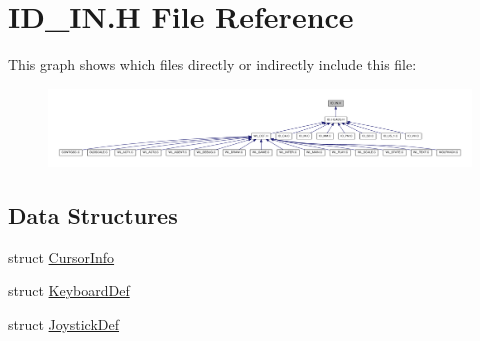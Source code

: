 \hypertarget{ID__IN_8H}{
\section{ID\_\-IN.H File Reference}
\label{ID__IN_8H}
}
This graph shows which files directly or indirectly include this file:
\nopagebreak
\begin{figure}[H]
\begin{center}
\leavevmode
\includegraphics[width=400pt]{ID__IN_8H__dep__incl}
\end{center}
\end{figure}
\subsection*{Data Structures}
\begin{DoxyCompactItemize}
\item 
struct \hyperlink{structCursorInfo}{CursorInfo}
\item 
struct \hyperlink{structKeyboardDef}{KeyboardDef}
\item 
struct \hyperlink{structJoystickDef}{JoystickDef}
\end{DoxyCompactItemize}

